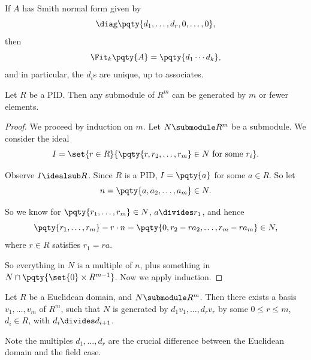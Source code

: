 \begin{corollary}
    \label{cor:fit-ideal-snf-uniqueness-if}%
    If \(A\) has Smith normal form given by
    \[
        \diag\pqty{d_1, \ldots, d_r, 0, \ldots, 0},
    \]
    then
    \[
        \Fit_k \pqty{A} = \pqty{d_1 \cdots d_k},
    \]
    and in particular, the \(d_i\)s are unique, up to associates.
\end{corollary}

\begin{proposition}
    \label{prop:size-generating-set-free-module}%
    Let \(R\) be a PID. Then any submodule of \(R^m\) can be generated by \(m\) or fewer elements.
\end{proposition}

\begin{proof}
    We proceed by induction on \(m\). Let \(N \submodule R^m\) be a submodule. We consider the ideal
    \[
        I = \set{r \in R}{\pqty{r, r_2, \ldots, r_m} \in N \text{ for some }r_i}.
    \]

    Observe \(I \idealsub R\). Since \(R\) is a PID, \(I = \pqty{a}\) for some \(a \in R\). So let
    \[
        n = \pqty{a, a_2, \ldots, a_m} \in N.
    \]

    So we know for \(\pqty{r_1, \ldots, r_m} \in N\), \(a \divides r_1\), and hence
    \[
        \pqty{r_1, \ldots, r_m} - r \cdot n = \pqty{0, r_2 - r a_2, \ldots, r_m - r a_m} \in N,
    \]
    where \(r \in R\) satisfies \(r_1 = ra\).

    So everything in \(N\) is a multiple of \(n\), plus something in \(N \cap \pqty{\set{0} \times R^{m - 1}}\). Now we apply induction.
\end{proof}

\begin{theorem}
    \label{thm:basis-free-module-adapts-submodule}%

    Let \(R\) be a Euclidean domain, and \(N \submodule R^m\). Then there exists a basis \(v_1, \ldots, v_m\) of \(R^m\), such that \(N\) is generated by \(d_1 v_1, \ldots, d_r v_r\) by some \(0 \leq r \leq m\), \(d_i \in R\), with \(d_i \divides d_{i + 1}\).
\end{theorem}

Note the multiples \(d_1, \ldots, d_r\) are the crucial difference between the Euclidean domain and the field case.

